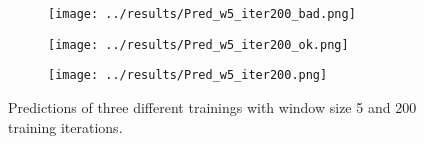 \documentclass{article}
\begin{document}
{\begin{figure}
	\begin{subfigure}[b]{0.15\textwidth}
		\centering    
        \texttt{[image: ../results/Pred\_w5\_iter200\_bad.png]}
    \end{subfigure}
	\begin{subfigure}[b]{0.15\textwidth}
		\centering    
        \texttt{[image: ../results/Pred\_w5\_iter200\_ok.png]}
    \end{subfigure}
	\begin{subfigure}[b]{0.15\textwidth}
		\centering    
        \texttt{[image: ../results/Pred\_w5\_iter200.png]}
    \end{subfigure}
    
    \caption{Predictions of three different trainings with window size 5 and 200 training iterations.}
\label{badPositions}
\end{figure}

}
\end{document}
